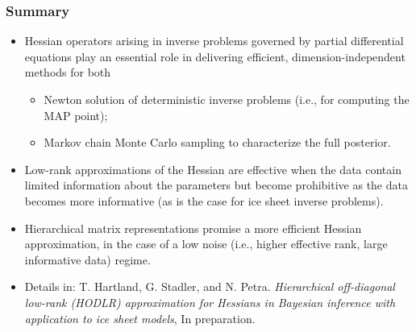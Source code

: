 \documentclass[10pt,final,xcolor=dvipsnames]{beamer}
\begin{document}
\begin{frame}
  \frametitle{Summary}

  \begin{itemize}
  \item Hessian operators arising in inverse problems governed by
    partial differential equations play an essential role in
    delivering efficient, dimension-independent methods for both
    \begin{itemize}
    \item Newton solution of deterministic inverse problems (i.e., for
      computing the MAP point);
      \vspace{0.05in}
    \item Markov chain Monte Carlo sampling to characterize the full
      posterior.
    \end{itemize}
    \vspace{0.05in}
  \item Low-rank approximations of the Hessian are effective when the
    data contain limited information about the parameters but become
    prohibitive as the data becomes more informative (as is the case
    for ice sheet inverse problems).
    \vspace{0.05in}
  \item Hierarchical matrix representations promise a more efficient
    Hessian approximation, in the case of a low noise (i.e., higher
    effective rank, large informative data) regime.
  \end{itemize}

  \begin{itemize}
  \item [] \scriptsize{Details in: T. Hartland, G. Stadler, and
    N. Petra. {\em Hierarchical off-diagonal low-rank (HODLR)
      approximation for Hessians in Bayesian inference with
      application to ice sheet models}, In preparation.}
  \end{itemize}
\end{frame}
\end{document}
